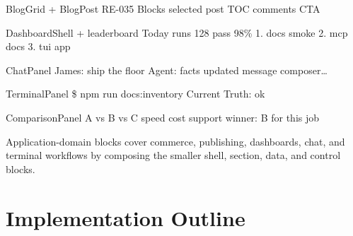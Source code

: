 BlogGrid + BlogPost RE-035 Blocks selected post TOC comments CTA

DashboardShell + leaderboard Today runs 128 pass 98\% 1. docs smoke 2. mcp docs 3. tui app

ChatPanel James: ship the floor Agent: facts updated message composer\ldots{}

TerminalPanel \$ npm run docs:inventory Current Truth: ok

ComparisonPanel A vs B vs C speed cost support winner: B for this job

Application-domain blocks cover commerce, publishing, dashboards, chat, and terminal workflows by composing the smaller shell, section, data, and control blocks.

\section{Implementation Outline}\label{record-128-implementation-outline}


